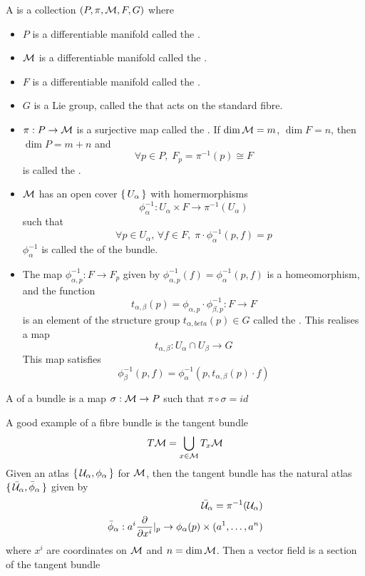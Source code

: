 \documentclass{article}
\begin{document}
\begin{definition}
A  is a collection $(P,\pi,\mathcal{M},F,G)$ where
\begin{itemize}
    \item $P$ is a differentiable manifold called the .
    \item $\mathcal{M}$ is a differentiable manifold called the .
    \item $F$ is a differentiable manifold called the .
    \item $G$ is a Lie group, called the  that acts on the standard fibre.
    \item $\pi:P\to\mathcal{M}$ is a surjective map called the . If $\dim\mathcal{M} = m$, $\dim F = n$, then $\dim P = m+n$ and \[
    \forall p\in P, \; F_p = \pi^{-1}(p) \cong F
    \]
    is called the .
    \item $\mathcal{M}$ has an open cover $\set{U_\alpha}$ with homermorphisms
    \[
    \phi_\alpha^{-1}: U_\alpha \times F \to \pi^{-1}(U_\alpha)
    \]
    such that 
    \[
    \forall p\in U_\alpha, \, \forall f \in F, \; \pi\cdot\phi_\alpha^{-1}(p,f) = p
    \]
    $\phi_\alpha^{-1}$ is called the  of the bundle.
    \item The map $\phi_{\alpha,p}^{-1} : F\to F_p$ given by $\phi_{\alpha,p}^{-1}(f) = \phi_\alpha^{-1}(p,f)$ is a homeomorphism, and the function 
    \[
    t_{\alpha,\beta}(p) = \phi_{\alpha,p} \cdot \phi_{\beta,p}^{-1} : F \to F
    \]
    is an element of the structure group $t_{\alpha,beta}(p)\in G$ called the . This realises a map 
    \[
    t_{\alpha,\beta} : U_\alpha \cap U_\beta \to G 
    \]
    This map satisfies 
    \[
    \phi_\beta^{-1}(p,f) = \phi_\alpha^{-1} (p, t_{\alpha,\beta}(p) \cdot f )
    \]
    \end{itemize}
\end{definition}

\begin{definition}
A  of a bundle is a map $\sigma:\mathcal{M}\to P$ such that $\pi\circ\sigma=id$
\end{definition}

\begin{example}
A good example of a fibre bundle is the tangent bundle
\[
T\mathcal{M} = \bigcup_{x\in\mathcal{M}} T_x \mathcal{M}
\]
Given an atlas $\set{\mathcal{U}_\alpha, \phi_\alpha}$ for $\mathcal{M}$, then the tangent bundle has the natural atlas $\set{\bar{\mathcal{U}}_\alpha, \bar{\phi}_\alpha}$ given by 
\begin{align*}
\bar{\mathcal{U}}_\alpha = \pi^{-1}(\mathcal{U}_\alpha) \\
\bar{\phi}_\alpha : a^i \frac{\partial}{\partial x^i} \rvert_p \to \phi_\alpha(p) \times (a^1,\dots,a^n)
\end{align*}
where $x^i$ are coordinates on $\mathcal{M}$ and $n=\dim\mathcal{M}$. Then a vector field is a section of the tangent bundle
\end{example}
\end{document}
